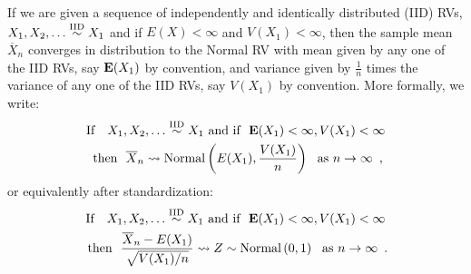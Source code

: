 \begin{prop}\label{P:CLT}

If we are given a sequence of independently and identically distributed (IID) RVs, $X_1,X_2,\ldots \overset{{\rm IID}}{\sim} X_1$ and if $E(X) < \infty$ and $V(X_1)<\infty$, then the sample mean $\overline{X}_n$ converges in 
distribution to the Normal RV with mean given by any one of the IID RVs, say $\mathbf{E}(X_1)$ by convention, and variance given by $\frac{1}{n}$ times the variance of any one of the IID RVs, say $V(X_1)$ by convention.  More formally, we write:
\begin{multline}\label{E:CLT}
\text{If} \quad X_1,X_2,\ldots \overset{\IID}{\sim} X_1 \ \text{and if } \ \e(X_1)<\infty, V(X_1) < \infty \\ \text{ then } \ \overline{X}_n \rightsquigarrow \normal\left(E(X_1), \frac{V(X_1)}{n}\right) \ \text{ as } n\to\infty \enspace ,
\end{multline}
or equivalently after standardization:
\begin{multline}\label{E:CLTStd}
\text{If} \quad X_1,X_2,\ldots \overset{\IID}{\sim} X_1 \ \text{and if } \ \e(X_1)<\infty, V(X_1) < \infty \\ \text{ then } \ \frac{\overline{X}_n - E(X_1)}{\sqrt{V(X_1)/n}} \rightsquigarrow Z \sim \normal\left(0,1 \right) \ \text{ as } n\to\infty \enspace .
\end{multline}


\end{prop}
